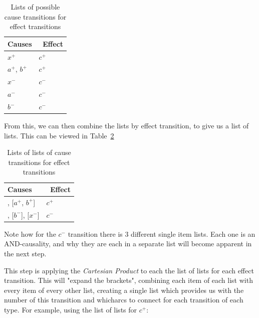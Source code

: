 \documentclass[british,conference,compsoc]{IEEEtran}
\begin{document}
\begin{table}[h]
\caption{Lists of possible cause transitions for effect transitions\label{tab:list-of-concepts}}

  \centering
\begin{tabular}[htb]{| m{2.6cm} | m{2.0cm} |}
  \hline
Causes & \, Effect \\ \hline \hline
$x^{+}$ & $c^{+}$ \\ \hline
$a^{+}$, $b^{+}$ & $c^{+}$ \\ \hline
$x^{-}$ & $c^{-}$ \\ \hline
$a^{-}$ & $c^{-}$ \\ \hline
$b^{-}$ & $c^{-}$ \\ \hline
  \end{tabular}
\end{table}

\noindent From this, we can then combine the lists by effect transition, to give us a list of lists.
This can be viewed in Table~\ref{tab:list-of-lists}

\begin{table}[h]
\caption{Lists of lists of cause transitions for effect transitions\label{tab:list-of-lists}}

  \centering
\begin{tabular}[htb]{| m{2.6cm} | m{2.0cm} |}
  \hline
Causes & \, Effect \\ \hline \hline
[$x^{+}$], [$a^{+}$, $b^{+}$] & $c^{+}$ \\ \hline
[$a^{-}$], [$b^{-}$], [$x^{-}$] & $c^{-}$ \\ \hline

  \end{tabular}
\end{table}

\noindent Note how for the $c^{-}$ transition there is 3 different single item 
lists. Each one is an AND-causality, and why they are each in a separate list
will become apparent in the next step. 

This step is applying the \emph{Cartesian Product} to each the list of lists
for each effect transition. This will "expand the brackets", combining each
item of each list with every item of every other list, creating a single list which
provides us with the number of this transition and  whicharcs to connect 
for each transition of each type. 
For example, using the list of lists for $c^{+}$:
\end{document}
